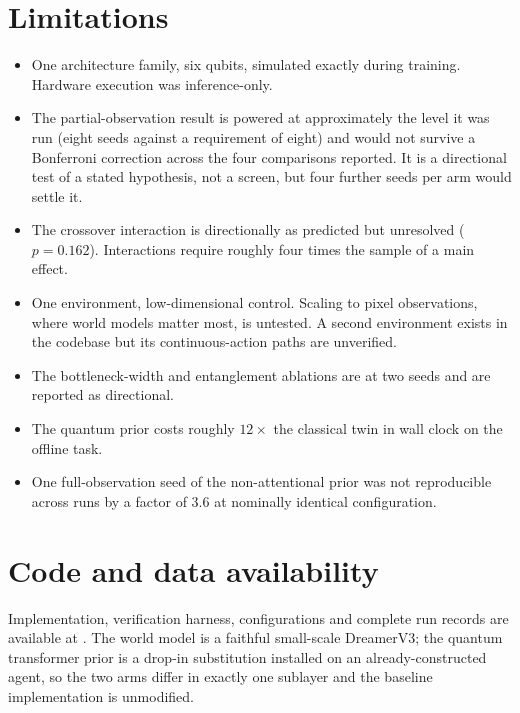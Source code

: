 \documentclass[11pt,onecolumn]{article}
\newif\ifdraft
\newcommand{\pend}[1]{%
  \ifdraft\textcolor{PendFG}{\textbf{[}\textit{#1}\textbf{]}}\fi}
\begin{document}
\section{Limitations}
\begin{itemize}\itemsep3pt
\item One architecture family, six qubits, simulated exactly during
      training. Hardware execution was inference-only.
\item The partial-observation result is powered at approximately the
      level it was run (eight seeds against a requirement of eight) and
      would not survive a Bonferroni correction across the four
      comparisons reported. It is a directional test of a stated
      hypothesis, not a screen, but four further seeds per arm would
      settle it.
\item The crossover interaction is directionally as predicted but
      unresolved ($p = 0.162$). Interactions require roughly four times
      the sample of a main effect.
\item One environment, low-dimensional control. Scaling to pixel
      observations, where world models matter most, is untested. A
      second environment exists in the codebase but its
      continuous-action paths are unverified.
\item The bottleneck-width and entanglement ablations are at two seeds
      and are reported as directional.
\item The quantum prior costs roughly $12\times$ the classical twin in
      wall clock on the offline task. \pend{closed-loop ratio from
      uninterrupted runs}
\item One full-observation seed of the non-attentional prior was not
      reproducible across runs by a factor of $3.6$ at nominally
      identical configuration. \pend{resolve: the leading hypothesis is
      CPU thread count altering floating-point reduction order}
\end{itemize}

\section*{Code and data availability}
Implementation, verification harness, configurations and complete run
records are available at \pend{repository URL and archival DOI}. The
world model is a faithful small-scale DreamerV3; the quantum transformer
prior is a drop-in substitution installed on an already-constructed
agent, so the two arms differ in exactly one sublayer and the baseline
implementation is unmodified.
\end{document}
